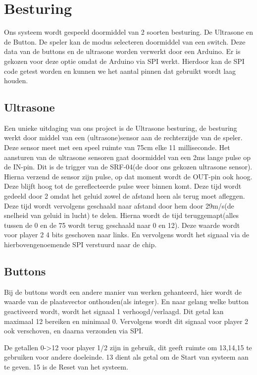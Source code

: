 \documentclass[oneside,dutch]{tudelft-report}
\begin{document}
\chapter{Besturing}
Ons systeem wordt gespeeld doormiddel van 2 soorten besturing. De Ultrasone en de Button. De speler kan de modus selecteren doormiddel van een switch. Deze data van de buttons en de ultrasone worden verwerkt door een Arduino. Er is gekozen voor deze optie omdat de Arduino via SPI werkt. Hierdoor kan de SPI code getest worden en kunnen we het aantal pinnen dat gebruikt wordt laag houden. 

\section{Ultrasone}
Een unieke uitdaging van ons project is de Ultrasone besturing, de besturing werkt door middel van een (ultrasone)sensor aan de rechterzijde van de speler. Deze sensor meet met een speel ruimte van 75cm elke 11 milliseconde. Het aansturen van de ultrasone sensoren gaat doormiddel van een 2ms lange pulse op de IN-pin. Dit is de trigger van de SRF-04(de door ons gekozen ultrasone sensor). Hierna verzend de sensor zijn pulse, op dat moment wordt de OUT-pin ook hoog. Deze blijft hoog tot de gereflecteerde pulse weer binnen komt. Deze tijd wordt gedeeld door 2 omdat het geluid zowel de afstand heen als terug moet afleggen. Deze tijd wordt vervolgens geschaald naar afstand door hem door 29m/s(de snelheid van geluid in lucht) te delen. Hierna wordt de tijd teruggemapt(alles tussen de 0 en de 75 wordt terug geschaald naar 0 en 12). Deze waarde wordt voor player 2 4 bits geschoven naar links. En vervolgens wordt het signaal via de hierbovengenoemende SPI verstuurd naar de chip.

\section{Buttons}
Bij de buttons wordt een andere manier van werken gehanteerd, hier wordt de waarde van de plaatsvector onthouden(als integer). En naar gelang welke button geactiveerd wordt, wordt het signaal 1 verhoogd/verlaagd. Dit getal kan maximaal 12 bereiken en minimaal 0. Vervolgens wordt dit signaal voor player 2 ook verschoven, en daarna verzonden via SPI.

De getallen 0->12 voor player 1/2 zijn in gebruik, dit geeft ruimte om 13,14,15 te gebruiken voor andere doeleinde. 13 dient als getal om de Start van systeem aan te geven. 15 is de Reset van het systeem.
\end{document}
